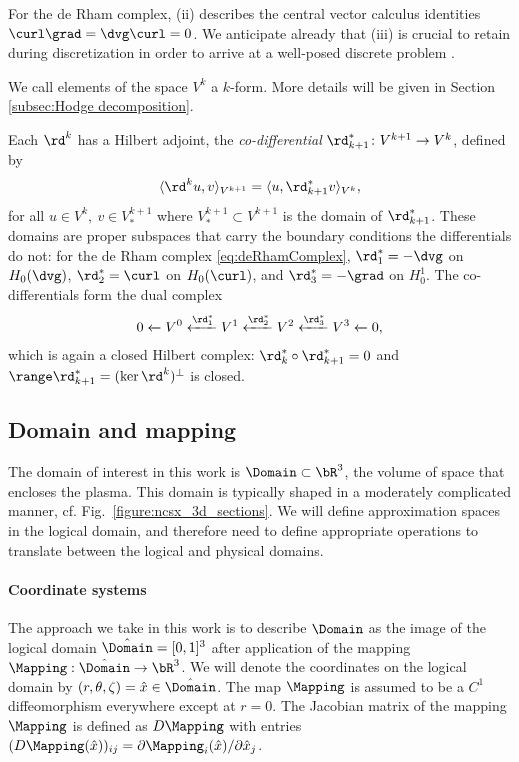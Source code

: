 \documentclass[%
 reprint,
 superscriptaddress,
 amsmath,amssymb,
 aps, nofootinbib, floatfix]{revtex4-2}
\begin{document}
For the de Rham complex, (ii) describes the central vector calculus identities $\curl \grad = \dvg \curl = 0$. We anticipate already that (iii) is crucial to retain during discretization in order to arrive at a well-posed discrete problem \citep[Theorem 4.15]{boffi_mixed_2013}.

We call elements of the space $V^k$ a $k$-form. More details will be given in Section \ref{subsec:Hodge decomposition}.

Each $\rd^k$ has a Hilbert adjoint, the \emph{co-differential} $\rd^*_{k+1} \colon V^{k+1} \to V^{k}$, defined by
\begin{align}
    \label{eq:co-differential}
    \langle \rd^k u, v \rangle_{V^{k+1}} = \langle u, \rd^*_{k+1} v \rangle_{V^{k}},
\end{align}
for all $u \in V^k,\ v \in V^{k+1}_*$ where $V^{k+1}_* \subset V^{k+1}$ is the domain of $\rd^*_{k+1}$. These domains are proper subspaces that carry the boundary conditions the differentials do not: for the de Rham complex \eqref{eq:deRhamComplex}, $\rd^*_1 = -\dvg$ on $H_0(\dvg)$, $\rd^*_2 = \curl$ on $H_0(\curl)$, and $\rd^*_3 = -\grad$ on $H^1_0$. The co-differentials form the dual complex
\begin{align}
    \label{eq:dualComplex}
    0 \xleftarrow[]{} V^0 \xleftarrow[]{\rd^*_1} V^1 \xleftarrow[]{\rd^*_2} V^2 \xleftarrow[]{\rd^*_3} V^3 \xleftarrow[]{} 0,
\end{align}
which is again a closed Hilbert complex: $\rd^*_{k} \circ \rd^*_{k+1} = 0$ and $\range \rd^*_{k+1} = (\ker \rd^k)^\perp$ is closed.

\subsection{Domain and mapping}
\label{subsec:domain_and_mapping}
The domain of interest in this work is $\Domain \subset \bR^3$, the volume of space that encloses the plasma. This domain is typically shaped in a moderately complicated manner, cf. Fig.~\ref{figure:ncsx_3d_sections}. We will define approximation spaces in the logical domain, and therefore need to define appropriate operations to translate between the logical and physical domains. 

\paragraph{Coordinate systems}
The approach we take in this work is to describe $\Domain$ as the image of the logical domain $\hat \Domain = [0, 1]^3$ after application of the mapping $\Mapping: \hat \Domain \to \bR^3$. We will denote the coordinates on the logical domain by $(r, \theta, \zeta) = \hat x \in \hat \Domain$. The map $\Mapping$ is assumed to be a $C^1$ diffeomorphism everywhere except at $r = 0$. The Jacobian matrix of the mapping $\Mapping$ is defined as $D\Mapping$ with entries $(D\Mapping(\hat x))_{ij} = {\partial \Mapping_i(\hat x)} / {\partial {\hat x_j}}$. 
\end{document}
